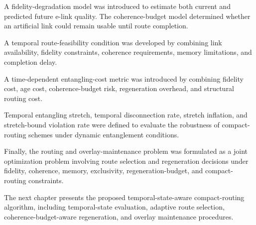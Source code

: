 A fidelity-degradation model was introduced to estimate both current and predicted future e-link quality. The coherence-budget model determined whether an artificial link could remain usable until route completion.

A temporal route-feasibility condition was developed by combining link availability, fidelity constraints, coherence requirements, memory limitations, and completion delay.

A time-dependent entangling-cost metric was introduced by combining fidelity cost, age cost, coherence-budget risk, regeneration overhead, and structural routing cost.

Temporal entangling stretch, temporal disconnection rate, stretch inflation, and stretch-bound violation rate were defined to evaluate the robustness of compact-routing schemes under dynamic entanglement conditions.

Finally, the routing and overlay-maintenance problem was formulated as a joint optimization problem involving route selection and regeneration decisions under fidelity, coherence, memory, exclusivity, regeneration-budget, and compact-routing constraints.

The next chapter presents the proposed temporal-state-aware compact-routing algorithm, including temporal-state evaluation, adaptive route selection, coherence-budget-aware regeneration, and overlay maintenance procedures.
